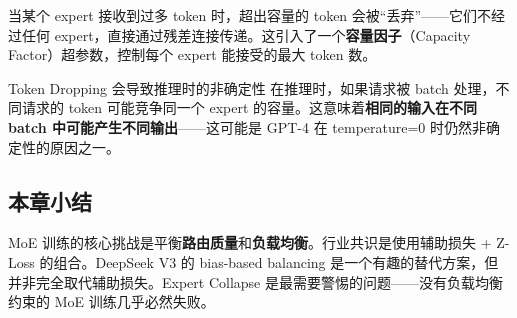当某个 expert 接收到过多 token 时，超出容量的 token 会被``丢弃''——它们不经过任何 expert，直接通过残差连接传递。这引入了一个\textbf{容量因子}（Capacity Factor）超参数，控制每个 expert 能接受的最大 token 数。

\begin{warningbox}{Token Dropping 会导致推理时的非确定性}
在推理时，如果请求被 batch 处理，不同请求的 token 可能竞争同一个 expert 的容量。这意味着\textbf{相同的输入在不同 batch 中可能产生不同输出}——这可能是 GPT-4 在 temperature=0 时仍然非确定性的原因之一。
\end{warningbox}

\subsection{本章小结}

MoE 训练的核心挑战是平衡\textbf{路由质量}和\textbf{负载均衡}。行业共识是使用辅助损失 + Z-Loss 的组合。DeepSeek V3 的 bias-based balancing 是一个有趣的替代方案，但并非完全取代辅助损失。Expert Collapse 是最需要警惕的问题——没有负载均衡约束的 MoE 训练几乎必然失败。



